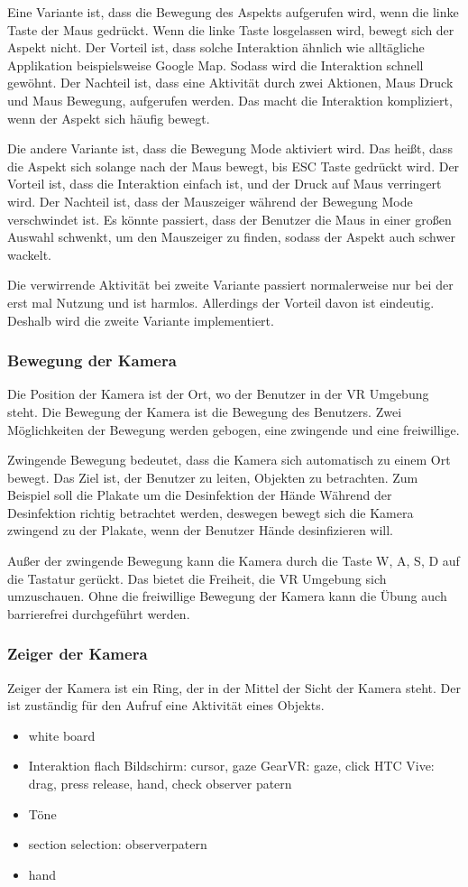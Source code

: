   Eine Variante ist, dass die Bewegung des Aspekts aufgerufen wird, wenn die linke Taste der Maus gedrückt. Wenn die linke Taste losgelassen wird, bewegt sich der Aspekt nicht. Der Vorteil ist, dass solche Interaktion ähnlich wie alltägliche Applikation beispielsweise Google Map. Sodass wird die Interaktion schnell gewöhnt. Der Nachteil ist, dass eine Aktivität durch zwei Aktionen, Maus Druck und Maus Bewegung, aufgerufen werden. Das macht die Interaktion kompliziert, wenn der Aspekt sich häufig bewegt.
  
  Die andere Variante ist, dass die Bewegung Mode aktiviert wird. Das heißt, dass die Aspekt sich solange nach der Maus bewegt, bis ESC Taste gedrückt wird. Der Vorteil ist, dass die Interaktion einfach ist, und der Druck auf Maus verringert wird. Der Nachteil ist, dass der Mauszeiger während der Bewegung Mode verschwindet ist. Es könnte passiert, dass der Benutzer die Maus in einer großen Auswahl schwenkt, um den Mauszeiger zu finden, sodass der Aspekt auch schwer wackelt.
  
  Die verwirrende Aktivität bei zweite Variante passiert normalerweise nur bei der erst mal Nutzung und ist harmlos. Allerdings der Vorteil davon ist eindeutig. Deshalb wird die zweite Variante implementiert.
  
  \subsubsection{Bewegung der Kamera}
  Die Position der Kamera ist der Ort, wo der Benutzer in der VR Umgebung steht. Die Bewegung der Kamera ist die Bewegung des Benutzers.
  Zwei Möglichkeiten der Bewegung werden gebogen, eine zwingende und eine freiwillige.
  
  Zwingende Bewegung bedeutet, dass die Kamera sich automatisch zu einem Ort bewegt. Das Ziel ist, der Benutzer zu leiten, Objekten zu betrachten. Zum Beispiel soll die Plakate um die Desinfektion der Hände Während der Desinfektion richtig betrachtet werden, deswegen bewegt sich die Kamera zwingend zu der Plakate, wenn der Benutzer Hände desinfizieren will.

  Außer der zwingende Bewegung kann die Kamera durch die Taste W, A, S, D auf die Tastatur gerückt. Das bietet die Freiheit, die VR Umgebung sich umzuschauen. Ohne die freiwillige Bewegung der Kamera kann die Übung auch barrierefrei durchgeführt werden.
  
  \subsubsection{Zeiger der Kamera} 
  Zeiger der Kamera ist ein Ring, der in der Mittel der Sicht der Kamera steht. Der ist zuständig für den Aufruf eine Aktivität eines Objekts.
  
  
\begin{itemize}
\item white board
\item Interaktion
\subitem flach Bildschirm: cursor, gaze
\subitem GearVR: gaze, click
\subitem HTC Vive: drag, press release, hand, check
\subitem observer patern
\item Töne
\item section selection: observerpatern
\item hand
\end{itemize}